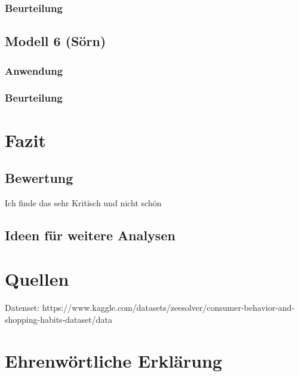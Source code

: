 \documentclass[
  letterpaper,
  DIV=11]{scrartcl}
\begin{document}
\hypertarget{beurteilung-4}{%
\subsubsection{Beurteilung}\label{beurteilung-4}}

\hypertarget{modell-6-suxf6rn}{%
\subsection{Modell 6 (Sörn)}\label{modell-6-suxf6rn}}

\hypertarget{anwendung-5}{%
\subsubsection{Anwendung}\label{anwendung-5}}

\hypertarget{beurteilung-5}{%
\subsubsection{Beurteilung}\label{beurteilung-5}}

\hypertarget{fazit}{%
\section{Fazit}\label{fazit}}

\hypertarget{bewertung}{%
\subsection{Bewertung}\label{bewertung}}

Ich finde das sehr Kritisch und nicht schön

\hypertarget{ideen-fuxfcr-weitere-analysen}{%
\subsection{Ideen für weitere
Analysen}\label{ideen-fuxfcr-weitere-analysen}}

\hypertarget{quellen}{%
\section{Quellen}\label{quellen}}

Datenset:
https://www.kaggle.com/datasets/zeesolver/consumer-behavior-and-shopping-habits-dataset/data

\hypertarget{ehrenwuxf6rtliche-erkluxe4rung}{%
\section{Ehrenwörtliche
Erklärung}\label{ehrenwuxf6rtliche-erkluxe4rung}}
\end{document}
